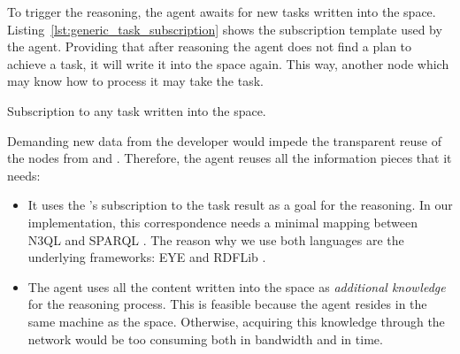 To trigger the reasoning, the agent awaits for new tasks written into the space.
Listing~\ref{lst:generic_task_subscription} shows the subscription template used by the agent.
Providing that after reasoning the agent does not find a plan to achieve a task, it will write it into the space again.
This way, another node which may know how to process it may take the task. %


\begin{listing}
  
  \caption{Subscription to any task written into the space.}
  \label{lst:generic_task_subscription}
\end{listing}


Demanding new data from the developer would impede the transparent reuse of the nodes from \implSpace{} and \implRest{}.
Therefore, the agent reuses all the information pieces that it needs:
\begin{itemize}
  \item It uses the \nodeConsSpace{}'s subscription to the task result as a goal for the reasoning.
	In our implementation, this correspondence needs a minimal mapping between N3QL  and SPARQL .
	The reason why we use both languages are the underlying frameworks: EYE  and RDFLib .
	
  \item The agent uses all the content written into the space as \emph{additional knowledge} for the reasoning process.
	This is feasible because the agent resides in the same machine as the space. %
	Otherwise, acquiring this knowledge through the network would be too consuming both in bandwidth and in time.
\end{itemize}



